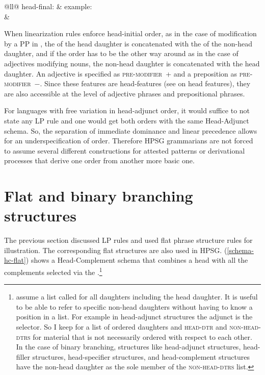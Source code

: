 \documentclass[output=paper,biblatex,babelshorthands,newtxmath,draftmode,colorlinks,citecolor=brown]{langscibook}
\begin{document}
\ex \begin{tabular}[t]{@{}ll@{}}
head-final:                            & example:\\
%
&%
\\
\end{tabular}
\zl
When linearization rules enforce head-initial order, as in the case of modification by a PP in
, the \phonv of the head daughter is concatenated with the \phonv of the non-head daughter,
and if the order has to be the other way around as in the case of adjectives modifying nouns, the
non-head daughter is concatenated with the head daughter. An adjective is specified as
\textsc{pre-modifier}~+ and a preposition as \textsc{pre-modifier}~$-$. Since these features are
head-features (see \crossrefchaptert[\page \pageref{page-hfp}]{properties} on head features), they
are also accessible at the level of adjective phrases and prepositional phrases.

\largerpage
For languages with free variation in head-adjunct order, it would suffice to not state any LP
rule and one would get both orders with the same Head-Adjunct schema. So, the separation of
immediate dominance and linear precedence allows for an underspecification of order. Therefore HPSG
grammarians are not forced to assume several different constructions for attested patterns or
derivational processes that derive one order from another more basic one.


\section{Flat and binary branching structures}
\label{sec-binary-flat}

The previous section discussed LP rules and used flat phrase structure rules for illustration. The
corresponding flat structures are also used in HPSG. (\ref{schema-hc-flat}) shows a Head-Complement schema that
combines a head with all the complements selected via the \compsl.\footnote{
  \citet[]{GSag2000a-u} assume a list called \dtrs for all daughters including the head
  daughter. It is useful to be able to refer to specific non-head daughters without having to know a
  position in a list. For example in head-adjunct structures the adjunct is the selector. So I keep
  \dtrs for a list of ordered daughters and \textsc{head-dtr} and \textsc{non-head-dtrs} for
  material that is not necessarily ordered with respect to each other. In the case of binary
  branching, structures like head-adjunct structures, head-filler structures, head-specifier
  structures, and head-complement structures have the non-head daughter as the sole member of the \textsc{non-head-dtrs} list.%
}
\end{document}

